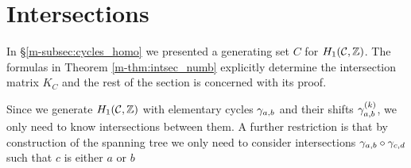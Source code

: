 \documentclass[main.tex]{subfiles}
\begin{document}
  \section{Intersections}\label{sec:intersections}

  In \S \ref{m-subsec:cycles_homo} we presented a generating set $C$ for $H_1(\mathcal{C},\mathbb{Z})$.
  The formulas in Theorem \ref{m-thm:intsec_numb} explicitly determine the
  intersection matrix $K_C$ and
  the rest of the section is concerned with its proof.


  Since we generate $H_1(\mathcal{C},\mathbb{Z})$ with elementary cycles $\gamma_{a,b}$ and their shifts $\gamma_{a,b}^{(k)}$,
  we only need to know intersections between them. A further restriction is that by construction
  of the spanning tree we only need to
  consider intersections $\gamma_{a,b}\circ\gamma_{c,d}$ such that $c$ is either $a$ or $b$
\end{document}
